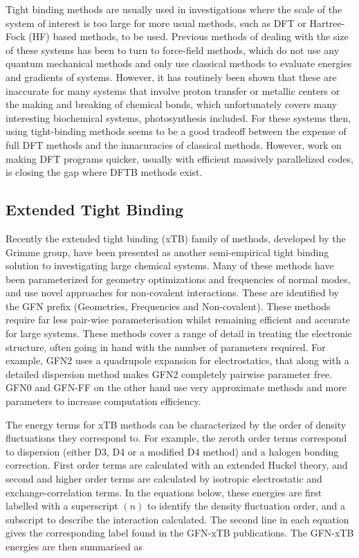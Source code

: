 Tight binding methods are usually used in investigations where the scale of the 
system of interest is too large for more usual methods, such as DFT or Hartree-Fock 
(HF) based methods, to be used. Previous methods of dealing with the size of these 
systems has been to turn to force-field methods, which do not use any quantum mechanical 
methods and only use classical methods to evaluate energies and gradients of systems. 
However, it has routinely been shown that these are inaccurate for many systems 
that involve proton transfer or metallic centers or the making and breaking of chemical 
bonds\cite{Salomon-Ferrer2013}, which unfortunately covers many interesting biochemical 
systems, photosynthesis included. For these systems then, using tight-binding methods 
seems to be a good tradeoff between the expense of full DFT methods and the innacuracies 
of classical methods. However, work on making DFT programs quicker, usually with efficient 
massively parallelized codes, is closing the gap where DFTB methods exist\cite{Manathunga2020}.

\subsection{Extended Tight Binding}
\label{subsec:xtb_methods}

Recently the extended tight binding (xTB) family of methods, developed by the Grimme 
group, have been presented as another semi-empirical tight binding solution to investigating 
large chemical systems\cite{Bannwarth2020}\cite{Bannwarth2019}\cite{Grimme2017}\cite{Pracht2019}\cite{Grimme2016}\cite{Spicher2020a}.
Many of these methods have been parameterized for geometry optimizations and frequencies 
of normal modes, and use novel approaches for non-covalent interactions. These are
identified by the GFN prefix (Geometries, Frequencies and Non-covalent). These methods
require far less pair-wise parameterisation whilst remaining efficient and accurate
for large systems. These methods cover a range of detail in treating the electronic
structure, often going in hand with the number of parameters required. For example,
GFN2 uses a quadrupole expansion for electrostatics, that along with a detailed 
dispersion method makes GFN2 completely pairwise parameter free. GFN0 and GFN-FF
on the other hand use very approximate methods and more parameters to increase computation
efficiency.

The energy terms for xTB methods can be characterized by the order of density fluctuations 
they correspond to. For example, the zeroth order terms correspond to dispersion 
(either D3\cite{Grimme2010}, D4\cite{Caldeweyher2020} or a modified D4 method) and
a halogen bonding correction. First order terms are calculated with an extended 
Huckel theory, and second and higher order terms are calculated by isotropic electrostatic
and exchange-correlation terms. In the equations below, these energies are first
labelled with a superscript $\left(n\right)$ to identify the density fluctuation 
order, and a subscript to describe the interaction calculated. The second line in
each equation gives the corresponding label found in the GFN-xTB publications. The
GFN-xTB energies are then summarised as

